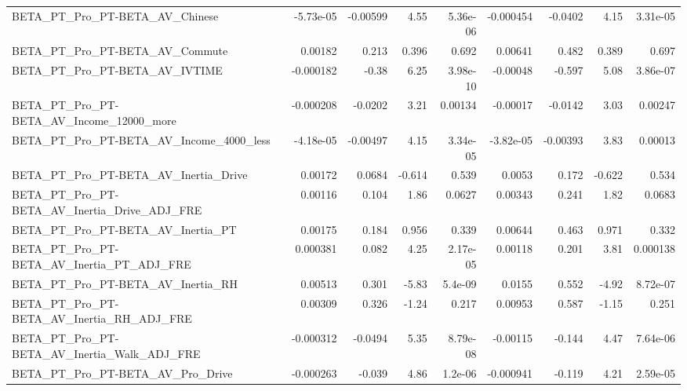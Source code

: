 \begin{tabular}{lrrrrrrrr}
BETA\_PT\_Pro\_PT-BETA\_AV\_Chinese                     &   -5.73e-05 &     -0.00599 &     4.55 & 5.36e-06 &  -0.000454 &     -0.0402 &         4.15 &      3.31e-05 \\
BETA\_PT\_Pro\_PT-BETA\_AV\_Commute                     &     0.00182 &        0.213 &    0.396 &    0.692 &    0.00641 &       0.482 &        0.389 &         0.697 \\
BETA\_PT\_Pro\_PT-BETA\_AV\_IVTIME                      &   -0.000182 &        -0.38 &     6.25 & 3.98e-10 &   -0.00048 &      -0.597 &         5.08 &      3.86e-07 \\
BETA\_PT\_Pro\_PT-BETA\_AV\_Income\_12000\_more           &   -0.000208 &      -0.0202 &     3.21 &  0.00134 &   -0.00017 &     -0.0142 &         3.03 &       0.00247 \\
BETA\_PT\_Pro\_PT-BETA\_AV\_Income\_4000\_less            &   -4.18e-05 &     -0.00497 &     4.15 & 3.34e-05 &  -3.82e-05 &    -0.00393 &         3.83 &       0.00013 \\
BETA\_PT\_Pro\_PT-BETA\_AV\_Inertia\_Drive               &     0.00172 &       0.0684 &   -0.614 &    0.539 &     0.0053 &       0.172 &       -0.622 &         0.534 \\
BETA\_PT\_Pro\_PT-BETA\_AV\_Inertia\_Drive\_ADJ\_FRE       &     0.00116 &        0.104 &     1.86 &   0.0627 &    0.00343 &       0.241 &         1.82 &        0.0683 \\
BETA\_PT\_Pro\_PT-BETA\_AV\_Inertia\_PT                  &     0.00175 &        0.184 &    0.956 &    0.339 &    0.00644 &       0.463 &        0.971 &         0.332 \\
BETA\_PT\_Pro\_PT-BETA\_AV\_Inertia\_PT\_ADJ\_FRE          &    0.000381 &        0.082 &     4.25 & 2.17e-05 &    0.00118 &       0.201 &         3.81 &      0.000138 \\
BETA\_PT\_Pro\_PT-BETA\_AV\_Inertia\_RH                  &     0.00513 &        0.301 &    -5.83 &  5.4e-09 &     0.0155 &       0.552 &        -4.92 &      8.72e-07 \\
BETA\_PT\_Pro\_PT-BETA\_AV\_Inertia\_RH\_ADJ\_FRE          &     0.00309 &        0.326 &    -1.24 &    0.217 &    0.00953 &       0.587 &        -1.15 &         0.251 \\
BETA\_PT\_Pro\_PT-BETA\_AV\_Inertia\_Walk\_ADJ\_FRE        &   -0.000312 &      -0.0494 &     5.35 & 8.79e-08 &   -0.00115 &      -0.144 &         4.47 &      7.64e-06 \\
BETA\_PT\_Pro\_PT-BETA\_AV\_Pro\_Drive                   &   -0.000263 &       -0.039 &     4.86 &  1.2e-06 &  -0.000941 &      -0.119 &         4.21 &      2.59e-05 \\

\end{tabular}
